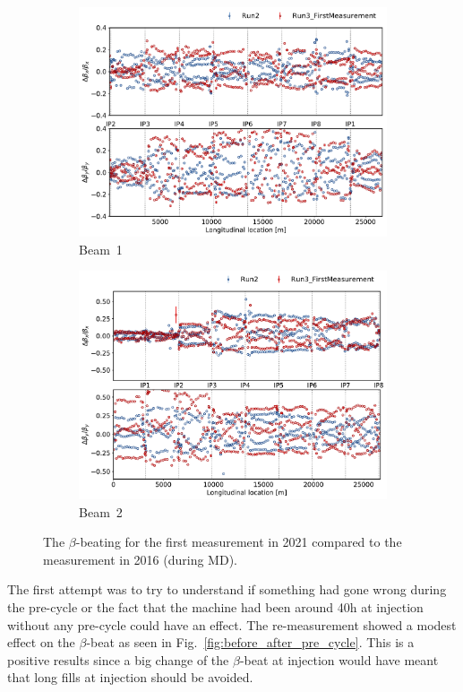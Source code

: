 \documentclass[a4paper]{cernatsnote}
\begin{document}
\begin{figure}[ht]
\begin{subfigure}{.5\textwidth}
  \centering
  \includegraphics[width=.8\linewidth]{plots/beam1/beta_beat_virgin_2016_2021.pdf}  
  \caption{Beam~1}
\end{subfigure}
\begin{subfigure}{.5\textwidth}
  \centering
  \includegraphics[width=.8\linewidth]{plots/beam2/B2_BetaBeat_2016_vs_first2021.pdf}  
  \caption{Beam~2}
\end{subfigure}
\caption{The $\beta$-beating for the first measurement in 2021 compared to the measurement in 2016 (during MD).}
\label{fig:initalVs2016}
\end{figure}

The first attempt was to try to understand if something had gone wrong during the pre-cycle or the fact that the machine had been around 40h at injection without any pre-cycle could have an effect. The re-measurement showed a modest effect on the $\beta$-beat as seen in Fig.~\ref{fig:before_after_pre_cycle}. This is a positive results since a big change of the $\beta$-beat at injection would have meant that long fills at injection should be avoided. 
\end{document}
